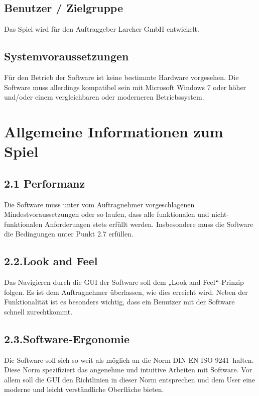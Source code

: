 \documentclass[12pt]{article}
\renewcommand{\_}{\kern-1.5pt\textunderscore\kern-1.5pt}
\begin{document}
\subsection*{Benutzer / Zielgruppe}
Das Spiel wird für den Auftraggeber Larcher GmbH entwickelt.
\subsection*{Systemvoraussetzungen}
Für den Betrieb der Software ist keine bestimmte Hardware vorgesehen. Die Software muss allerdings kompatibel sein mit Microsoft Windows 7 oder höher und/oder einem vergleichbaren oder moderneren Betriebssystem.

\vspace{\baselineskip}\section*{Allgemeine Informationen zum Spiel }
\subsection{2.1 Performanz }
Die Software muss unter vom Auftragnehmer vorgeschlagenen Mindestvoraussetzungen oder so laufen, dass alle funktionalen und nicht-funktionalen Anforderungen stets erfüllt werden. Insbesondere muss die Software die Bedingungen unter Punkt 2.7 erfüllen.
\subsection{2.2.\hspace*{10pt}Look and Feel}
Das Navigieren durch die GUI der Software soll dem „Look and Feel$``$-Prinzip folgen. Es ist dem Auftragnehmer überlassen, wie dies erreicht wird. Neben der Funktionalität ist es besonders wichtig, dass ein Benutzer mit der Software schnell zurechtkommt.
\subsection{2.3.\hspace*{10pt}Software-Ergonomie}
Die Software soll sich so weit als möglich an die Norm DIN EN ISO 9241\  halten. Diese Norm spezifiziert das angenehme und intuitive Arbeiten mit Software. Vor allem soll die GUI den Richtlinien in dieser Norm entsprechen und dem User eine moderne und leicht verständliche Oberfläche bieten.
\end{document}
